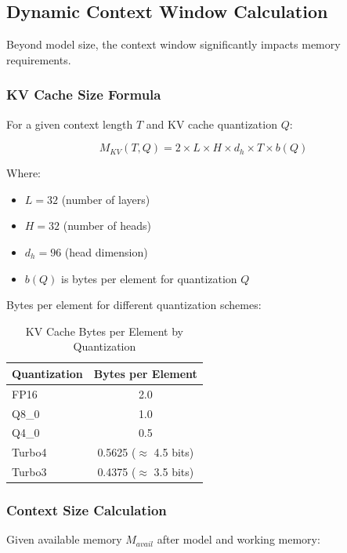\subsection{Dynamic Context Window Calculation}

Beyond model size, the context window significantly impacts memory requirements.

\subsubsection{KV Cache Size Formula}

For a given context length $T$ and KV cache quantization $Q$:

\begin{equation}
M_{KV}(T, Q) = 2 \times L \times H \times d_h \times T \times b(Q)
\end{equation}

Where:
\begin{itemize}
    \item $L = 32$ (number of layers)
    \item $H = 32$ (number of heads)
    \item $d_h = 96$ (head dimension)
    \item $b(Q)$ is bytes per element for quantization $Q$
\end{itemize}

Bytes per element for different quantization schemes:

\begin{table}[h]
\centering
\caption{KV Cache Bytes per Element by Quantization}
\label{tab:kv_bytes}
\begin{tabular}{lc}
\toprule
\textbf{Quantization} & \textbf{Bytes per Element} \\
\midrule
FP16 & 2.0 \\
Q8\_0 & 1.0 \\
Q4\_0 & 0.5 \\
Turbo4 & 0.5625 ($\approx$ 4.5 bits) \\
Turbo3 & 0.4375 ($\approx$ 3.5 bits) \\
\bottomrule
\end{tabular}
\end{table}

\subsubsection{Context Size Calculation}

Given available memory $M_{avail}$ after model and working memory:

